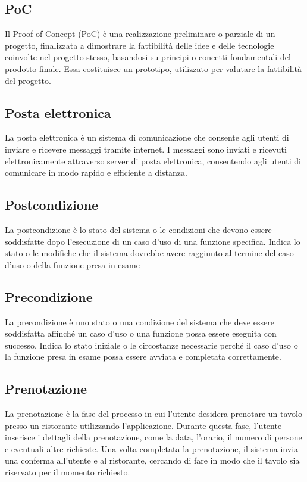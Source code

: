 \subsection{PoC} 
Il  Proof of Concept (PoC) è una realizzazione preliminare o parziale di un progetto, finalizzata a dimostrare la fattibilità delle idee e delle tecnologie coinvolte nel progetto stesso, basandosi su principi o concetti fondamentali del prodotto finale. Essa costituisce un prototipo, utilizzato per valutare la fattibilità del progetto. 
\subsection{Posta elettronica} 
La posta elettronica è un sistema di comunicazione che consente agli utenti di inviare e ricevere messaggi tramite internet. I messaggi sono inviati e ricevuti elettronicamente attraverso server di posta elettronica, consentendo agli utenti di comunicare in modo rapido e efficiente a distanza. 
\subsection{Postcondizione} 
La postcondizione è lo stato del sistema o le condizioni che devono essere soddisfatte dopo l'esecuzione di un caso d'uso di una funzione specifica. Indica lo stato o le modifiche che il sistema dovrebbe avere raggiunto al termine del caso d'uso o della funzione presa in esame 
\subsection{Precondizione} 
La precondizione è uno stato o una condizione del sistema che deve essere soddisfatta affinché un caso d'uso o una funzione possa essere eseguita con successo. Indica lo stato iniziale o le circostanze necessarie perché il caso d'uso o la funzione presa in esame possa essere avviata e completata correttamente. 
\subsection{Prenotazione} 
La prenotazione è la fase del processo in cui l'utente desidera prenotare un tavolo presso un ristorante utilizzando l'applicazione. Durante questa fase, l'utente inserisce i dettagli della prenotazione, come la data, l'orario, il numero di persone e eventuali altre richieste. Una volta completata la prenotazione, il sistema invia una conferma all'utente e al ristorante, cercando di fare in modo che il tavolo sia riservato per il momento richiesto. 
